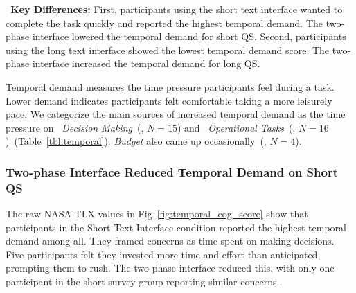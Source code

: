 \begin{tldrbox}
   \faKey~\textbf{Key Differences:} %
    First, participants using the short text interface wanted to complete the task quickly and reported the highest temporal demand. The two-phase interface lowered the temporal demand for short QS. Second, participants using the long text interface showed the lowest temporal demand score. The two-phase interface increased the temporal demand for long QS.
\end{tldrbox}

Temporal demand measures the time pressure participants feel during a task. Lower demand indicates participants felt comfortable taking a more leisurely pace. We categorize the main sources of increased temporal demand as the time pressure on ~\textit{Decision Making}~(, $N=15$) and ~\textit{Operational Tasks}~(, $N=16$)~(Table~\ref{tbl:temporal}). \textit{Budget} also came up occasionally~(, $N=4$).

\subsubsection{Two-phase Interface Reduced Temporal Demand on Short QS} The raw NASA-TLX values in Fig~\ref{fig:temporal_cog_score} show that participants in the Short Text Interface condition reported the highest temporal demand among all. They framed concerns as time spent on making decisions. Five participants felt they invested more time and effort than anticipated, prompting them to rush. The two-phase interface reduced this, with only one participant in the short survey group reporting similar concerns.

